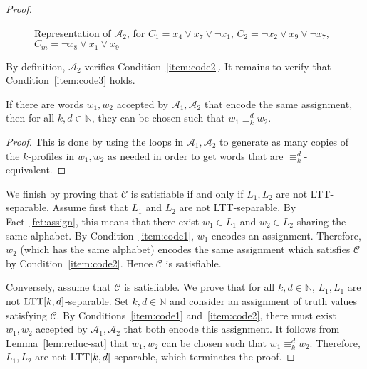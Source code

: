 \documentclass{LMCS}
\newcommand\nat{\ensuremath{\mathbb{N}}\xspace}
\newcommand\As{\ensuremath{\mathcal{A}}\xspace}
\newcommand\Cs{\ensuremath{\mathcal{C}}\xspace}
\newcommand{\ltt}{\textup{LTT}\xspace}
\newcommand\profiles[1]{$#1$-profiles\xspace}
\newcommand\kprofiles{\profiles{k}}
\newcommand\ltteq[2]{\ensuremath{\equiv_{#1}^{#2}}\xspace}
\newcommand\kdltteq{\ltteq{k}{d}}
\theoremstyle{plain}
\begin{document}
\begin{proof}
\begin{figure}[h]
\begin{center}
    \end{center}
    \caption{Representation of $\As_2$, for $C_1=x_4 \vee x_7 \vee
      \neg x_1$, $C_2=\neg x_2 \vee x_9 \vee \neg x_7$, $C_m=\neg x_8 \vee x_1 \vee x_9$}
    \label{fig:a2}
  \end{figure}



  By definition, $\As_2$ verifies Condition~\eqref{item:code2}. It remains to verify that
  Condition~\eqref{item:code3} holds.

  \begin{lem} \label{lem:reduc-sat} If there are words $w_1,w_2$
    accepted by $\As_1,\As_2$ that encode the same assignment, then
    for all $k,d \in \nat$, they can be chosen such that $w_1 \kdltteq
    w_2$.
  \end{lem}

  \begin{proof}
    This is done by using the loops in $\As_1,\As_2$ to generate as many
    copies of the \kprofiles in $w_1,w_2$ as needed in order to get words
    that are $\kdltteq$-equivalent.
  \end{proof}

  We finish by proving that \Cs is satisfiable if and only if $L_1,L_2$
  are not \ltt-separable. Assume first that $L_1$ and
  $L_2$ are not \ltt-separable. By Fact~\ref{fct:assign},
  this means that there exist $w_1 \in L_1$ and $w_2 \in
  L_2$ sharing the same alphabet. By Condition~\eqref{item:code1}, $w_1$ encodes an
  assignment. Therefore, $w_2$ (which has the same alphabet) encodes the
  same assignment which satisfies \Cs by Condition~\eqref{item:code2}. Hence $\Cs$ is
  satisfiable.

  Conversely, assume that \Cs is satisfiable. We prove that for all $k,d
  \in \nat$,  $L_1,L_1$ are not $\ltt[k,d]$-separable. Set $k,d
  \in \nat$ and consider an assignment of truth values satisfying
  \Cs. By Conditions~\eqref{item:code1} and~\eqref{item:code2}, there must exist $w_1,w_2$ accepted by $\As_1,
  \As_2$ that both encode this assignment. It follows from
  Lemma~\ref{lem:reduc-sat} that $w_1,w_2$ can be chosen such that $w_1  
  \kdltteq w_2$. Therefore, $L_1,L_2$ are not
  $\ltt[k,d]$-separable, which terminates the proof.
\end{proof}
\end{document}
